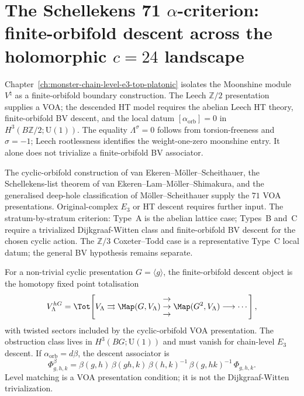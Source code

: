 %

\chapter[Schellekens 71 $\alpha$ criterion]{The Schellekens 71
$\alpha$-criterion: finite-orbifold descent across the holomorphic
$c = 24$ landscape}
\label{ch:schellekens-71-alpha-classification-platonic}

Chapter~\ref*{ch:monster-chain-level-e3-top-platonic} isolates the
Moonshine module $V^\natural$ as a finite-orbifold boundary
construction. The Leech $\mathbb{Z}/2$ presentation supplies a VOA;
the descended HT model requires the abelian Leech HT theory,
finite-orbifold BV descent, and the local datum
$[\alpha_{\mathrm{orb}}]=0$ in
$H^3(B\mathbb{Z}/2;\mathrm{U}(1))$. The equality
$\Lambda^\sigma=0$ follows from torsion-freeness and $\sigma=-1$;
Leech rootlessness identifies the weight-one-zero moonshine entry. It
alone does not trivialize a finite-orbifold BV associator.

The cyclic-orbifold construction of van Ekeren--M\"oller--Scheithauer,
the Schellekens-list theorem of van Ekeren--Lam--M\"oller--Shimakura,
and the generalised deep-hole classification of
M\"oller--Scheithauer supply the $71$ VOA presentations. Original-complex
$E_3$ or HT descent requires further input. The stratum-by-stratum
criterion: Type~A is the abelian lattice case; Types~B and~C require a
trivialized Dijkgraaf-Witten class and finite-orbifold BV descent for the
chosen cyclic action. The $\mathbb{Z}/3$ Coxeter--Todd case is a
representative Type~C local datum; the general BV hypothesis remains
separate.

For a non-trivial cyclic presentation $G=\langle g\rangle$, the
finite-orbifold descent object is the homotopy fixed point
totalisation
\[
 V_\Lambda^{hG}
 =
 \Tot\!\left[
 V_\Lambda \rightrightarrows \Map(G,V_\Lambda)
 \;\begin{matrix}\to\\[-0.65ex]\to\\[-0.65ex]\to\end{matrix}\;
 \Map(G^2,V_\Lambda)
 \longrightarrow \cdots
 \right],
\]
with twisted sectors included by the cyclic-orbifold VOA
presentation.  The obstruction class lives in
$H^3(BG;\mathrm{U}(1))$ and must vanish for chain-level $E_3$ descent.
If $\alpha_{\mathrm{orb}}=d\beta$, the descent associator is
\[
 \Phi^\beta_{g,h,k}
 =
 \beta(g,h)\,\beta(gh,k)\,\beta(h,k)^{-1}\,
 \beta(g,hk)^{-1}\,\Phi_{g,h,k}.
\]
Level matching is a VOA presentation condition; it is not the
Dijkgraaf-Witten trivialization.

